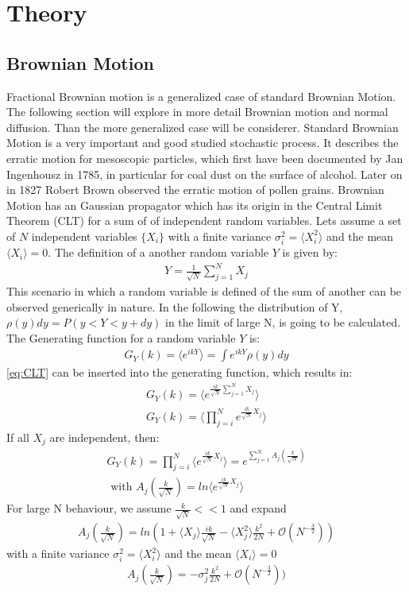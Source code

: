 \documentclass[
  a4paper,BCOR10mm,oneside,
  bibtotoc,idxtotoc,
  headsepline,footsepline,%
  fleqn,openbib
]{scrbook}
\begin{document}
\chapter{Theory}
\section{Brownian Motion}
Fractional Brownian motion is a generalized case of standard Brownian Motion. The following section  will explore in more detail Brownian motion and normal diffusion. Than the more generalized case will be considerer. \newline
Standard Brownian Motion is a very important and good studied stochastic process. It describes the erratic motion for mesoscopic particles, which  first have been documented by Jan Ingenhousz in 1785, in particular for coal dust on the surface of alcohol. Later on in 1827 Robert Brown observed the erratic motion of pollen grains.  Brownian Motion has an Gaussian propagator which has its origin in the Central Limit Theorem (CLT) for a sum of of independent random variables. Lets assume a set of $N$ independent variables $\{X_i\}$ with a finite variance $ \sigma_i^2=\langle X_{i}^2\rangle $ and the mean $\langle X_{i}\rangle = 0$. The definition of a another random variable $Y$ is given by:
 \begin{align}
  Y = \frac{1}{\sqrt{N}} \sum_{j=1}^N X_j \label{eq:CLT}
 \end{align}
This scenario in which a random variable is defined of the sum of another can be observed generically in nature. In the following the distribution of Y, $\rho(y)dy=P(y<Y<y+dy)$ in the limit of large N, is going to be calculated. 
The Generating function for a random variable $Y$ is: 
\begin{align}
 G_Y(k)=\langle e^{ikY}\rangle = \int e^{ikY} \rho(y)dy
\end{align}
\ref{eq:CLT} can be inserted into the generating function, which results in:
\begin{align*}
G_Y(k)=\langle e^{\frac{ik}{\sqrt{N}} \sum_{j=1}^N X_j}\rangle \\
G_Y(k)=\langle \prod_{j=i}^N e^{\frac{ik}{\sqrt{N}} X_j} \rangle 
\end{align*}
If all $X_j$ are independent, then:
\begin{align}
 G_Y(k)= \prod_{j=i}^N \langle e^{\frac{ik}{\sqrt{N}} X_j} \rangle =e^{\sum_{j=1}^N A_j (\frac{k}{\sqrt{N}})} \\ \nonumber \text{ with } A_j(\frac{k}{\sqrt{N}})= ln \langle e^{\frac{ik}{\sqrt{N}} X_j} \rangle 
\end{align}
For large N behaviour, we assume $\frac{k}{\sqrt{N}} << 1$ and expand
\begin{align}
 A_j(\frac{k}{\sqrt{N}}) = ln(1+ \langle X_j \rangle \frac{ik}{\sqrt{N}} - \langle X_{j}^2 \rangle \frac{k^2}{2N}+\mathcal{O}(N^{- \frac{3}{2}}))
\end{align}
 with a finite variance $ \sigma_i^2=\langle X_{i}^2\rangle $ and the mean $\langle X_{i}\rangle = 0$
\begin{align}
 A_j(\frac{k}{\sqrt{N}}) = -\sigma_j^2 \frac{k^2}{2N}+\mathcal{O}(N^{- \frac{3}{2}}))
\end{align}
\end{document}

